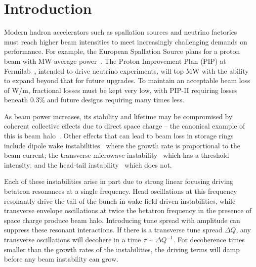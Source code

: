 \documentclass[aps,prstab,twocolumn, groupedaddress]{revtex4-1}
\begin{document}
\section{Introduction}


%

Modern hadron accelerators such as spallation sources and neutrino factories must reach higher beam intensities to meet increasingly challenging demands on performance. For example, the European Spallation Source plans for a proton beam with \unit[5]{MW} average power~\cite{ess_report}. The Proton Improvement Plan (PIP) at Fermilab~\cite{pipii}, intended to drive neutrino experiments, will top \unit[1]{MW} with the ability to expand beyond that for future upgrades. To maintain an acceptable beam loss of \unit[1]{W/m}, fractional losses must be kept very low, with PIP-II requiring losses beneath $0.3\%$ and future designs requiring many times less.

As beam power increases, its stability and lifetime may be compromised by coherent collective effects due to direct space charge -- the canonical example of this is beam halo~\cite{oconnell_etal:93, gluckstern:94, jameson:94, bruhwiler:95}. Other effects that can lead to beam loss in storage rings include dipole wake instabilities~\cite{courant_sessler:66, ferlinghi_pellegrini_touschek:66} where the growth rate is proportional to the beam current; the transverse microwave instability~\cite{talman:82} which has a threshold intensity; and the head-tail instability~\cite{pellegrini:69} which does not.

Each of these instabilities arise in part due to strong linear focusing driving betatron resonances at a single frequency. Head oscillations at this frequency resonantly drive the tail of the bunch in wake field driven instabilities, while  transverse envelope oscillations at twice the betatron frequency in the presence of space charge produce beam halo. Introducing tune spread with amplitude can suppress these resonant interactions. If there is a transverse tune spread $\Delta Q$, any transverse oscillations will decohere in a time $\tau \sim \Delta Q^{-1}$. For decoherence times smaller than the growth rates of the instabilities, the driving terms will damp before any beam instability can grow.
\end{document}
